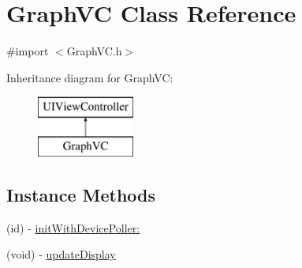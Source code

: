 \hypertarget{interface_graph_v_c}{\section{Graph\-V\-C Class Reference}
\label{interface_graph_v_c}
}


{\ttfamily \#import $<$Graph\-V\-C.\-h$>$}

Inheritance diagram for Graph\-V\-C\-:\begin{figure}[H]
\begin{center}
\leavevmode
\includegraphics[height=2.000000cm]{interface_graph_v_c}
\end{center}
\end{figure}
\subsection*{Instance Methods}
\begin{DoxyCompactItemize}
\item 
(id) -\/ \hyperlink{interface_graph_v_c_ad0a240dde98905eca43bb92db53e9478}{init\-With\-Device\-Poller\-:}
\item 
(void) -\/ \hyperlink{interface_graph_v_c_a7521f143474f68142628970e9f1d7706}{update\-Display}
\end{DoxyCompactItemize}
